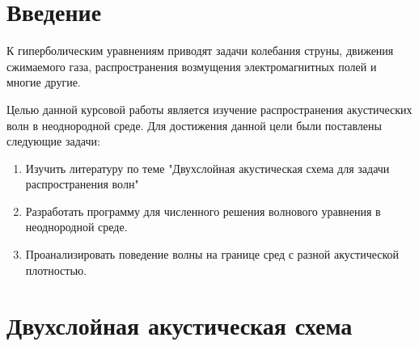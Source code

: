 \documentclass[a4paper, fontsize=14pt]{article} \usepackage{course_work} 
\begin{document}
%
\newpage
\tableofcontents
\newpage
\section*{Введение}
К гиперболическим уравнениям приводят задачи колебания струны, движения сжимаемого газа,
распространения возмущения электромагнитных полей и многие другие.

Целью данной курсовой работы является изучение распространения акустических волн в неоднородной
среде. Для достижения данной цели были поставлены следующие задачи:
\begin{enumerate}
    \item Изучить литературу по теме "Двухслойная акустическая схема для задачи распространения волн"
    \item Разработать программу для численного решения волнового уравнения в неоднородной среде.
    \item Проанализировать поведение волны на границе сред с разной акустической плотностью.
\end{enumerate}
\newpage
\section{Двухслойная акустическая схема}
\end{document}
